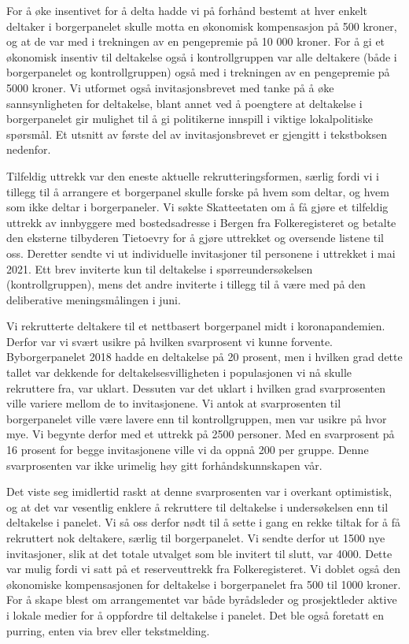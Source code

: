 \documentclass[
  12pt,
  a4paper, 12pt]{article}
\begin{document}
For å øke insentivet for å delta hadde vi på forhånd bestemt at hver enkelt deltaker i borgerpanelet skulle motta en økonomisk kompensasjon på 500 kroner, og at de var med i trekningen av en pengepremie på 10 000 kroner. For å gi et økonomisk insentiv til deltakelse også i kontrollgruppen var alle deltakere (både i borgerpanelet og kontrollgruppen) også med i trekningen av en pengepremie på 5000 kroner. Vi utformet også invitasjonsbrevet med tanke på å øke sannsynligheten for deltakelse, blant annet ved å poengtere at deltakelse i borgerpanelet gir mulighet til å gi politikerne innspill i viktige lokalpolitiske spørsmål. Et utsnitt av første del av invitasjonsbrevet er gjengitt i tekstboksen nedenfor.

Tilfeldig uttrekk var den eneste aktuelle rekrutteringsformen, særlig fordi vi i tillegg til å arrangere et borgerpanel skulle forske på hvem som deltar, og hvem som ikke deltar i borgerpaneler. Vi søkte Skatteetaten om å få gjøre et tilfeldig uttrekk av innbyggere med bostedsadresse i Bergen fra Folkeregisteret og betalte den eksterne tilbyderen Tietoevry for å gjøre uttrekket og oversende listene til oss. Deretter sendte vi ut individuelle invitasjoner til personene i uttrekket i mai 2021. Ett brev inviterte kun til deltakelse i spørreundersøkelsen (kontrollgruppen), mens det andre inviterte i tillegg til å være med på den deliberative meningsmålingen i juni.

Vi rekrutterte deltakere til et nettbasert borgerpanel midt i koronapandemien. Derfor var vi svært usikre på hvilken svarprosent vi kunne forvente. Byborgerpanelet 2018 hadde en deltakelse på 20 prosent, men i hvilken grad dette tallet var dekkende for deltakelsesvilligheten i populasjonen vi nå skulle rekruttere fra, var uklart. Dessuten var det uklart i hvilken grad svarprosenten ville variere mellom de to invitasjonene. Vi antok at svarprosenten til borgerpanelet ville være lavere enn til kontrollgruppen, men var usikre på hvor mye. Vi begynte derfor med et uttrekk på 2500 personer. Med en svarprosent på 16 prosent for begge invitasjonene ville vi da oppnå 200 per gruppe. Denne svarprosenten var ikke urimelig høy gitt forhåndskunnskapen vår.

Det viste seg imidlertid raskt at denne svarprosenten var i overkant optimistisk, og at det var vesentlig enklere å rekruttere til deltakelse i undersøkelsen enn til deltakelse i panelet. Vi så oss derfor nødt til å sette i gang en rekke tiltak for å få rekruttert nok deltakere, særlig til borgerpanelet. Vi sendte derfor ut 1500 nye invitasjoner, slik at det totale utvalget som ble invitert til slutt, var 4000. Dette var mulig fordi vi satt på et reserveuttrekk fra Folkeregisteret. Vi doblet også den økonomiske kompensasjonen for deltakelse i borgerpanelet fra 500 til 1000 kroner. For å skape blest om arrangementet var både byrådsleder og prosjektleder aktive i lokale medier for å oppfordre til deltakelse i panelet. Det ble også foretatt en purring, enten via brev eller tekstmelding.
\end{document}
